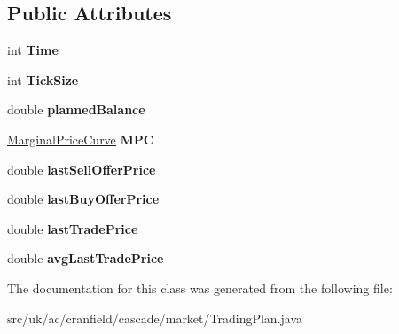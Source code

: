 \subsection*{Public Attributes}
\begin{DoxyCompactItemize}
\item 
\hypertarget{classuk_1_1ac_1_1cranfield_1_1cascade_1_1market_1_1_trading_plan_a0877c995904feef2be5f039ed30571dc}{int {\bfseries Time}}\label{classuk_1_1ac_1_1cranfield_1_1cascade_1_1market_1_1_trading_plan_a0877c995904feef2be5f039ed30571dc}

\item 
\hypertarget{classuk_1_1ac_1_1cranfield_1_1cascade_1_1market_1_1_trading_plan_a4f98a9372234aab49e5197c386746740}{int {\bfseries Tick\-Size}}\label{classuk_1_1ac_1_1cranfield_1_1cascade_1_1market_1_1_trading_plan_a4f98a9372234aab49e5197c386746740}

\item 
\hypertarget{classuk_1_1ac_1_1cranfield_1_1cascade_1_1market_1_1_trading_plan_ab06fb8d6cef60b0ca75cbda77b73fe7d}{double {\bfseries planned\-Balance}}\label{classuk_1_1ac_1_1cranfield_1_1cascade_1_1market_1_1_trading_plan_ab06fb8d6cef60b0ca75cbda77b73fe7d}

\item 
\hypertarget{classuk_1_1ac_1_1cranfield_1_1cascade_1_1market_1_1_trading_plan_a6ea23713d1ccf928a3f029c2fca8ee42}{\hyperlink{classuk_1_1ac_1_1cranfield_1_1cascade_1_1market_1_1_marginal_price_curve}{Marginal\-Price\-Curve} {\bfseries M\-P\-C}}\label{classuk_1_1ac_1_1cranfield_1_1cascade_1_1market_1_1_trading_plan_a6ea23713d1ccf928a3f029c2fca8ee42}

\item 
\hypertarget{classuk_1_1ac_1_1cranfield_1_1cascade_1_1market_1_1_trading_plan_a9ae8524bd23c8264d48d14819de594e5}{double {\bfseries last\-Sell\-Offer\-Price}}\label{classuk_1_1ac_1_1cranfield_1_1cascade_1_1market_1_1_trading_plan_a9ae8524bd23c8264d48d14819de594e5}

\item 
\hypertarget{classuk_1_1ac_1_1cranfield_1_1cascade_1_1market_1_1_trading_plan_a92e11dfe7e2d2e20c7d1c825493cb642}{double {\bfseries last\-Buy\-Offer\-Price}}\label{classuk_1_1ac_1_1cranfield_1_1cascade_1_1market_1_1_trading_plan_a92e11dfe7e2d2e20c7d1c825493cb642}

\item 
\hypertarget{classuk_1_1ac_1_1cranfield_1_1cascade_1_1market_1_1_trading_plan_af2c0c01b5213c2da8da86380c390ff55}{double {\bfseries last\-Trade\-Price}}\label{classuk_1_1ac_1_1cranfield_1_1cascade_1_1market_1_1_trading_plan_af2c0c01b5213c2da8da86380c390ff55}

\item 
\hypertarget{classuk_1_1ac_1_1cranfield_1_1cascade_1_1market_1_1_trading_plan_a78a6896b66ef08176663266c7db433b6}{double {\bfseries avg\-Last\-Trade\-Price}}\label{classuk_1_1ac_1_1cranfield_1_1cascade_1_1market_1_1_trading_plan_a78a6896b66ef08176663266c7db433b6}

\end{DoxyCompactItemize}


The documentation for this class was generated from the following file\-:\begin{DoxyCompactItemize}
\item 
src/uk/ac/cranfield/cascade/market/Trading\-Plan.\-java\end{DoxyCompactItemize}
